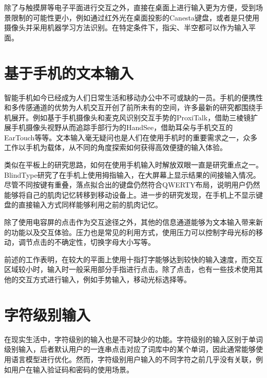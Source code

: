 除了与触摸屏等电子平面进行交互之外，直接在桌面上进行输入更为方便，受到场景限制的可能性更小，例如通过红外光在桌面投影的Canesta键盘\cite{roeber2003typing}，或者是只使用摄像头并采用机器学习方法识别\cite{murase2012gesture}。在特定条件下，指尖\cite{2019tiptext}、半空\cite{2015atk}都可以作为输入平面。

\section{基于手机的文本输入} %
智能手机如今已经成为人们日常生活和移动办公中不可或缺的一员。手机的便携性和多传感通道的优势为人机交互开创了前所未有的空间，许多最新的研究都围绕手机展开。例如基于手机摄像头和麦克风识别交互手势的ProxiTalk\cite{yang2019proxitalk}，借助三棱镜扩展手机摄像头视野从而追踪手部行为的HandSee\cite{yu2019handsee}，借助耳朵与手机交互的EarTouch\cite{wang2019eartouch}等等。文本输入毫无疑问也是人们在使用手机时的重要需求之一，众多工作以手机为载体，从不同的角度探索如何获得高效便捷的输入体验。

类似在平板上的研究思路，如何在使用手机输入时解放双眼一直是研究重点之一。BlindType\cite{2017blindtype}研究了在手机上使用拇指输入，在大屏幕上显示结果的间接输入情况。尽管不同按键有重叠，落点拟合出的键盘仍然符合QWERTY布局，说明用户仍然能够将自己的肌肉记忆转移到移动设备上。进一步的研究发现，在手机上不显示键盘的直接输入方式同样能够利用之前的肌肉记忆\cite{zhu2018typing}。

除了使用电容屏的点击作为交互途径之外，其他的信息通道能够为文本输入带来新的功能以及交互体验。压力也是常见的利用方式，使用压力可以控制字母光标的移动\cite{2018forceboard}，调节点击的不确定性\cite{weir2014uncertain}，切换字母大小写\cite{brewster2009pressure}等。



前述的工作表明，在较大的平面上使用十指打字能够达到较快的输入速度\cite{2018shitoast}，而交互区域较小时，输入时一般采用部分手指进行点击\cite{2017blindtype}\cite{zhu2018typing}。除了点击，也有一些技术使用其他的交互方式进行输入，例如手势输入\cite{murase2012gesture}\cite{zhu2019sfree}，移动光标选择\cite{2018forceboard}等。

\section{字符级别输入}
在现实生活中，字符级别的输入也是不可缺少的功能。字符级别的输入区别于单词级别输入，后者默认用户的一连串点击对应了词库中的某个单词，因此通常能够使用语言模型进行优化。然而，字符级别用户输入的不同字符之前几乎没有关联，例如用户在输入验证码和密码的使用场景。

